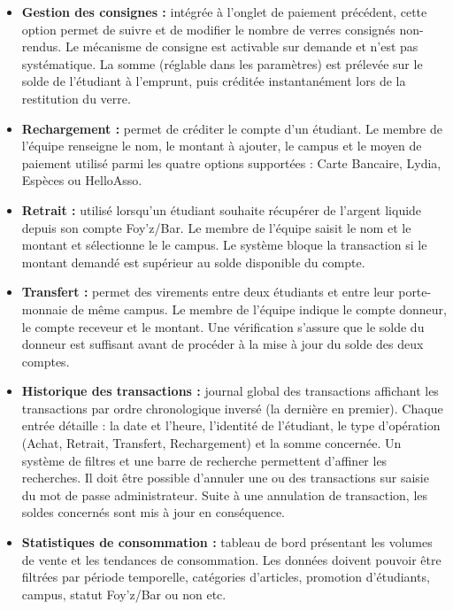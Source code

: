 \documentclass[a4paper,11pt]{article}
\begin{document}
\begin{itemize}
    Enfin, cet onglet doit présenter une option "payer directement" qui permet à un visiteur ne possédant pas de compte de régler directement sa commande. Ces transactions seront détaillées séparément dans les onglets Statistiques et Trésorerie.
    \item \textbf{Gestion des consignes :} intégrée à l'onglet de paiement précédent, cette option permet de suivre et de modifier le nombre de verres consignés non-rendus. Le mécanisme de consigne est activable sur demande et n'est pas systématique. La somme (réglable dans les paramètres) est prélevée sur le solde de l'étudiant à l'emprunt, puis créditée instantanément lors de la restitution du verre.
    \item \textbf{Rechargement :} permet de créditer le compte d'un étudiant. Le membre de l'équipe renseigne le nom, le montant à ajouter, le campus et le moyen de paiement utilisé parmi les quatre options supportées : Carte Bancaire, Lydia, Espèces ou HelloAsso.
    \item \textbf{Retrait :} utilisé lorsqu'un étudiant souhaite récupérer de l'argent liquide depuis son compte Foy'z/Bar. Le membre de l'équipe saisit le nom et le montant et sélectionne le le campus. Le système bloque la transaction si le montant demandé est supérieur au solde disponible du compte.
    \item \textbf{Transfert :} permet des virements entre deux étudiants et entre leur porte-monnaie de même campus. Le membre de l'équipe indique le compte donneur, le compte receveur et le montant. Une vérification s'assure que le solde du donneur est suffisant avant de procéder à la mise à jour du solde des deux comptes.
    \item \textbf{Historique des transactions :} journal global des transactions affichant les transactions par ordre chronologique inversé (la dernière en premier). Chaque entrée détaille : la date et l'heure, l'identité de l'étudiant, le type d'opération (Achat, Retrait, Transfert, Rechargement) et la somme concernée. Un système de filtres et une barre de recherche permettent d'affiner les recherches. Il doit être possible d'annuler une ou des transactions sur saisie du mot de passe administrateur. Suite à une annulation de transaction, les soldes concernés sont mis à jour en conséquence.
    \item \textbf{Statistiques de consommation :} tableau de bord présentant les volumes de vente et les tendances de consommation. Les données doivent pouvoir être filtrées par période temporelle, catégories d'articles, promotion d'étudiants, campus, statut Foy'z/Bar ou non etc.

\end{itemize}
\end{document}
